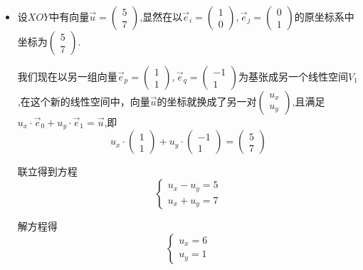 \documentclass[UTF8]{article}
\begin{document}
\begin{itemize}
	\item 设$XOY$中有向量$\vec{u} = 
\left(
\begin{array}{l}
5 \\ 
7
\end{array}
\right)
$,显然在以$\vec{e}_i = 
\left(
\begin{array}{l}
1 \\ 
0
\end{array}
\right), \vec{e}_j = 
\left(
\begin{array}{l}
0 \\ 
1
\end{array}
\right)$的原坐标系中坐标为$
\left(
\begin{array}{l}
5 \\ 
7
\end{array}
\right)$.

我们现在以另一组向量$\vec{e}_p = 
\left(
\begin{array}{l}
1 \\ 
1
\end{array}
\right), \vec{e}_q = 
\left(
\begin{array}{l}
-1 \\ 
1
\end{array}
\right)$为基张成另一个线性空间$V_1$,在这个新的线性空间中，向量$\vec{u}$的坐标就换成了另一对$
\left(
\begin{array}{l}
u_x \\ 
u_y
\end{array}
\right)
$,且满足$u_x\cdot \vec{e}_0 + u_y\cdot \vec{e}_1 = \vec{u}
$,即$$
u_x\cdot \left(
\begin{array}{l}
1 \\ 
1
\end{array}
\right) + u_y\cdot \left(
\begin{array}{l}
-1 \\ 
1
\end{array}
\right) = \left(
\begin{array}{l}
5 \\ 
7
\end{array}
\right)
$$

联立得到方程$$
\left\{
\begin{array}{l}
u_x - u_y = 5 \\ 
u_x + u_y = 7
\end{array}
\right.
$$

解方程得$$
\left\{
\begin{array}{l}
u_x = 6 \\
u_y = 1
\end{array}
\right.
$$


\end{itemize}
\end{document}
